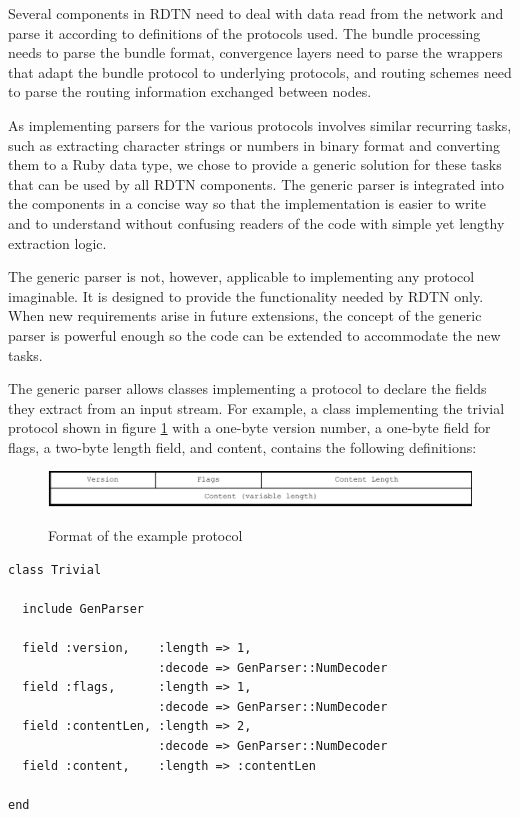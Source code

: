 \documentclass[a4paper]{article}
\begin{document}
Several components in RDTN need to deal with data read from the network and parse it
according to definitions of the protocols used. The bundle processing needs to
parse the bundle format, convergence layers need to parse the wrappers that
adapt the bundle protocol to underlying protocols, and routing schemes need to
parse the routing information exchanged between nodes.

As implementing parsers for the various protocols involves similar recurring
tasks, such as extracting character strings or numbers in binary format and
converting them to a Ruby data type, we chose to provide a generic solution for
these tasks that can be used by all RDTN components. The generic parser is
integrated into the components in a concise way so that the implementation is
easier to write and to understand without confusing readers of the code with
simple yet lengthy extraction logic. 

The generic parser is not, however, applicable to implementing any protocol
imaginable. It is designed to provide the functionality needed by RDTN only.
When new requirements arise in future extensions, the concept of the generic
parser is powerful enough so the code can be extended to accommodate the new
tasks.

The generic parser allows classes implementing a protocol to declare the fields
they extract from an input stream. For example, a class implementing the trivial
protocol shown in figure \ref{fig.example-format} with a one-byte version
number, a one-byte field for flags, a two-byte length field, and content,
contains the following definitions:

\begin{figure}[h]
\begin{center}
\includegraphics[width=0.9\columnwidth]{example-format.pdf}\\
\caption{\label{fig.example-format} Format of the example protocol}
\end{center}
\end{figure}

\begin{verbatim}
class Trivial

  include GenParser

  field :version,    :length => 1,
                     :decode => GenParser::NumDecoder
  field :flags,      :length => 1,
                     :decode => GenParser::NumDecoder
  field :contentLen, :length => 2,
                     :decode => GenParser::NumDecoder
  field :content,    :length => :contentLen

end
\end{verbatim}
\end{document}
